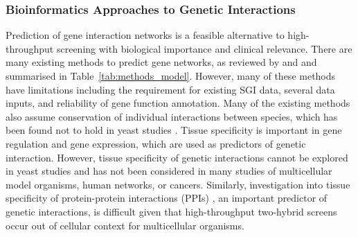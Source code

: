 \subsubsection{Bioinformatics Approaches to Genetic Interactions}

Prediction of gene interaction networks is a feasible alternative to high-throughput screening with biological importance and clinical relevance. There are many existing methods to predict gene networks, as reviewed by \citet{vanSteen2011} and \citet{Boucher2013} and summarised in Table~\ref{tab:methods_model}. However, many of these methods have limitations including the requirement for existing \gls{SGI} data, several data inputs, and reliability of gene function annotation. Many of the existing methods also assume conservation of individual interactions between species, which has been found not to hold in yeast studies \citep{Dixon2008}. Tissue specificity is important in gene regulation and gene expression, which are used as predictors of genetic interaction. However, tissue specificity of genetic interactions cannot be explored in yeast studies and has not been considered in many studies of multicellular model organisms, human networks, or cancers. Similarly, investigation into tissue specificity of protein-protein interactions (PPIs) , an important predictor of genetic interactions, is difficult given that high-throughput two-hybrid screens occur out of cellular context for multicellular organisms.  

